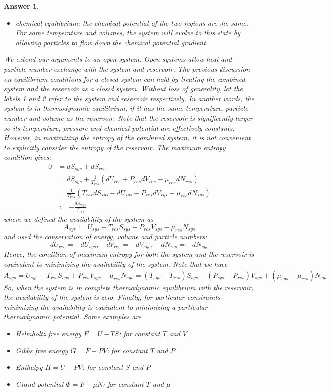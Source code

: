 \documentclass[a4paper]{article}
\theoremstyle{new2}
\newtheorem{ans}{Answer}[section]
\theoremstyle{new}
\begin{document}
\begin{ans}
\begin{itemize}
    \item chemical equilibrium: the chemical potential of the two regions are the same. For same temperature and volumes, the system will evolve to this state by allowing particles to flow down the chemical potential gradient.
\end{itemize}
We extend our arguments to an open system. Open systems allow heat and particle number exchange with the system and reservoir. The previous discussion on equilibrium conditions for a closed system can hold by treating the combined system and the reservoir as a closed system. Without loss of generality, let the labels 1 and 2 refer to the system and reservoir respectively. In another words, the system is in thermodynamic equilibrium, if it has the same temperature, particle number and volume as the reservoir. Note that the reservoir is significantly larger so its temperature, pressure and chemical potential are effectively constants.\\[5pt]
However, in maximizing the entropy of the combined system, it is not convenient to explicitly consider the entropy of the reservoir. The maximum entropy condition gives:
\begin{align}
    0&=dS_{sys}+dS_{res}\nonumber\\&=dS_{sys}+\frac{1}{T_{res}}(dU_{res}+P_{res}dV_{res}-\mu_{res}dN_{res})\nonumber\\&=\frac{1}{T_{res}}(T_{res}dS_{sys}-dU_{sys}-P_{res}dV_{sys}+\mu_{res}dN_{sys})\nonumber\\&:=-\frac{dA_{sys}}{T_{res}}\nonumber
\end{align}
where we defined the availability of the system as
$$A_{sys}:=U_{sys}-T_{res}S_{sys}+P_{res}V_{sys}-\mu_{res}N_{sys}$$
and used the conservation of energy, volume and particle numbers:
$$dU_{res}=-dU_{sys},\quad dV_{res}=-dV_{sys},\quad dN_{res}=-dN_{sys}$$
Hence, the condition of maximum entropy for both the system and the reservoir is equivalent to minimizing the availability of the system. Note that we have
$$A_{sys}=U_{sys}-T_{res}S_{sys}+P_{res}V_{sys}-\mu_{res}N_{sys}=(T_{sys}-T_{res})S_{sys}-(P_{sys}-P_{res})V_{sys}+(\mu_{sys}-\mu_{res})N_{sys}$$
So, when the system is in complete thermodynamic equilibrium with the reservoir, the availability of the system is zero. Finally, for particular constraints, minimizing the availability is equivalent to minimizing a particular thermodynamic potential. Some examples are
\begin{itemize}
    \item Helmholtz free energy $F=U-TS$: for constant $T$ and $V$
    \item Gibbs free energy $G=F-PV$: for constant $T$ and $P$
    \item Enthalpy $H=U-PV$: for constant $S$ and $P$
    \item Grand potential $\Phi=F-\mu N$: for constant $T$ and $\mu$
\end{itemize}
\end{ans}
\end{document}
